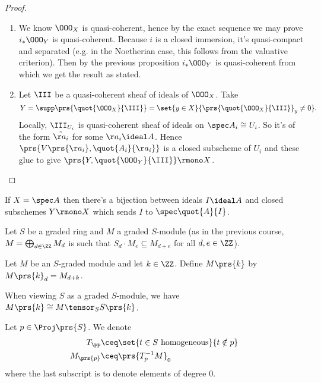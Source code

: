 \documentclass[10pt,a4paper,twoside,openany,hidelinks]{book}
\begin{document}
\begin{proof}
\begin{enumerate}
\item
We know $\OOO_X$ is quasi-coherent, hence by the exact sequence we may prove $i_* \OOO_Y$ is quasi-coherent. Because $i$ is a closed immersion, it's quasi-compact and separated (e.g. in the Noetherian case, this follows from the valuative criterion).
Then by the previous proposition $i_* \OOO_Y$ is quasi-coherent from which we get the result as stated.
\item Let $\III$ be a quasi-coherent sheaf of ideals of $\OOO_X$. Take \[Y = \supp\prs{\quot{\OOO_X}{\III}} = \set{y \in X}{\prs{\quot{\OOO_X}{\III}}_y \neq 0} \text{.}\]
Locally, $\III_{U_i}$ is quasi-coherent sheaf of ideals on $\spec A_i \cong U_i$. So it's of the form $\tilde{\aa_i}$ for some $\aa_i \ideal A$.
Hence $\prs{V\prs{\aa_i}, \quot{A_i}{\aa_i}}$ is a closed subscheme of $U_i$ and these glue to give $\prs{Y, \quot{\OOO_Y}{\III}} \rmono X$.
\end{enumerate}
\end{proof}

\begin{corollary}
If $X =\spec A$ then there's a bijection between ideals $I \ideal A$ and closed subschemes $Y \rmono X$ which sends $I$ to $\spec \quot{A}{I}$.
\end{corollary}


Let $S$ be a graded ring and $M$ a graded $S$-module (as in the previous course, $M = \bigoplus_{d \in \ZZ} M_d$ is such that $S_d \cdot M_e \subseteq M_{d+e}$ for all $d,e \in \ZZ$).

\begin{definition}
Let $M$ be an $S$-graded module and let $k \in \ZZ$. Define $M\prs{k}$ by $M\prs{k}_d = M_{d+k}$.
\end{definition}

\begin{definition}
When viewing $S$ as a graded $S$-module, we have $M\prs{k} \cong M \tensor_S S\prs{k}$.
\end{definition}

\begin{notation}
Let $p \in \Proj \prs{S}$.
We denote
\begin{align*}
T_\pp &\ceq \set{t \in S \text{ homogeneous}}{t \notin p} \\
M_{\prs{p}} &\ceq \prs{T_p^{-1} M}_0
\end{align*}
where the last subscript is to denote elements of degree $0$.
\end{notation}
\end{document}
